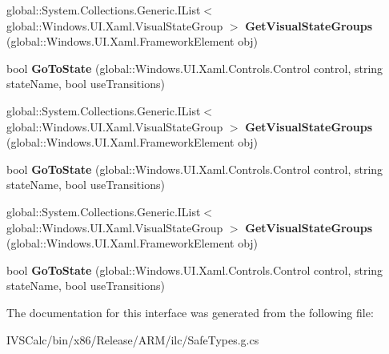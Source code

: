 \begin{DoxyCompactItemize}
\item 
\mbox{\label{interface_windows_1_1_u_i_1_1_xaml_1_1_i_visual_state_manager_statics_a558e618e26d67db8090e17d5499ddae1}} 
global\+::\+System.\+Collections.\+Generic.\+I\+List$<$ global\+::\+Windows.\+U\+I.\+Xaml.\+Visual\+State\+Group $>$ {\bfseries Get\+Visual\+State\+Groups} (global\+::\+Windows.\+U\+I.\+Xaml.\+Framework\+Element obj)
\item 
\mbox{\label{interface_windows_1_1_u_i_1_1_xaml_1_1_i_visual_state_manager_statics_a770de5eb5679fcbc1892580b35f8f030}} 
bool {\bfseries Go\+To\+State} (global\+::\+Windows.\+U\+I.\+Xaml.\+Controls.\+Control control, string state\+Name, bool use\+Transitions)
\item 
\mbox{\label{interface_windows_1_1_u_i_1_1_xaml_1_1_i_visual_state_manager_statics_a558e618e26d67db8090e17d5499ddae1}} 
global\+::\+System.\+Collections.\+Generic.\+I\+List$<$ global\+::\+Windows.\+U\+I.\+Xaml.\+Visual\+State\+Group $>$ {\bfseries Get\+Visual\+State\+Groups} (global\+::\+Windows.\+U\+I.\+Xaml.\+Framework\+Element obj)
\item 
\mbox{\label{interface_windows_1_1_u_i_1_1_xaml_1_1_i_visual_state_manager_statics_a770de5eb5679fcbc1892580b35f8f030}} 
bool {\bfseries Go\+To\+State} (global\+::\+Windows.\+U\+I.\+Xaml.\+Controls.\+Control control, string state\+Name, bool use\+Transitions)
\item 
\mbox{\label{interface_windows_1_1_u_i_1_1_xaml_1_1_i_visual_state_manager_statics_a558e618e26d67db8090e17d5499ddae1}} 
global\+::\+System.\+Collections.\+Generic.\+I\+List$<$ global\+::\+Windows.\+U\+I.\+Xaml.\+Visual\+State\+Group $>$ {\bfseries Get\+Visual\+State\+Groups} (global\+::\+Windows.\+U\+I.\+Xaml.\+Framework\+Element obj)
\item 
\mbox{\label{interface_windows_1_1_u_i_1_1_xaml_1_1_i_visual_state_manager_statics_a770de5eb5679fcbc1892580b35f8f030}} 
bool {\bfseries Go\+To\+State} (global\+::\+Windows.\+U\+I.\+Xaml.\+Controls.\+Control control, string state\+Name, bool use\+Transitions)
\end{DoxyCompactItemize}


The documentation for this interface was generated from the following file\+:\begin{DoxyCompactItemize}
\item 
I\+V\+S\+Calc/bin/x86/\+Release/\+A\+R\+M/ilc/Safe\+Types.\+g.\+cs\end{DoxyCompactItemize}
